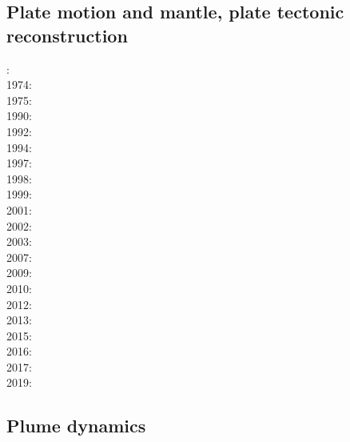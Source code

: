 {\scriptsize
\noindent
\cite{hack90}
\cite{hack91}
\cite{mokd00}
\cite{agzf14}
\cite{duay16}
\cite{rohb20}
}

\subsection{Plate motion and mantle, plate tectonic reconstruction}

{\scriptsize
{}: \cite{mcse73}\\
1974: \cite{sosl74}\\
1975: \cite{harp75}\\
1990: \cite{dega90}\\
1992: \cite{zieg92a}\\
1994: \cite{guto94}\\
1997: \cite{wean97b}\\
1998: \cite{zhgm98}\\
1999: \cite{ribr99}\\
2001: \cite{yohk01}\\
2002: \cite{stoc02}\\
2003: \cite{evan03}\cite{reta03}\\
2007: \cite{zhzl07}\\
2009: \cite{lizh09}\cite{vasv09}\cite{iabu09}\cite{scbs09}\\
2010: \cite{stto10}\cite{dega10}\\
2012: \cite{huss12}\cite{gutz12}\cite{qumm12}\cite{holr12}\cite{dost12}\cite{shbs12}\\
2013: \cite{mosq13}\cite{cost13}\\
2015: \cite{yoha15}\\
2016: \cite{pric16}\\
2017: \cite{stid17}\\
2019: \cite{tewg19}\cite{weco19}
}

\subsection{Plume dynamics}

